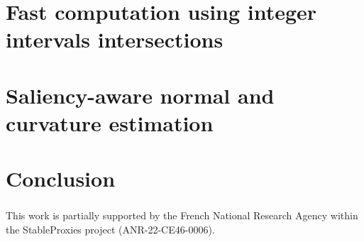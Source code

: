 \documentclass[runningheads]{llncs}
\begin{document}


    \section{Fast computation using integer intervals intersections}
    



    \section{Saliency-aware normal and curvature estimation}
    



    \section{Conclusion}
    

    \begin{credits}
        \subsubsection{\ackname}
        This work is partially supported by the French National Research Agency
        within the StableProxies project (ANR-22-CE46-0006).
    \end{credits}
%
%
%
    
    
\end{document}
